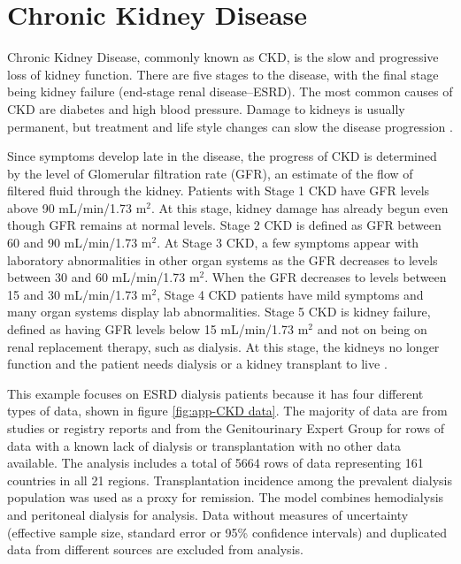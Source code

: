 \chapter{Chronic Kidney Disease}
\label{applications-fits_incon_v_con}

Chronic Kidney Disease, commonly known as CKD, is the slow and progressive loss of kidney function. There are five stages to the disease, with the final stage being kidney failure (end-stage renal disease--ESRD). The most common causes of CKD are diabetes and high blood pressure.  Damage to kidneys is usually permanent, but treatment and life style changes can slow the disease progression \cite{national_KDOQI_2002}.

Since symptoms develop late in the disease, the progress of CKD is determined by the level of Glomerular filtration rate (GFR), an estimate of the flow of filtered fluid through the kidney. Patients with Stage 1 CKD have GFR levels above 90 mL/min/1.73 m$^2$.  At this stage, kidney damage has already begun even though GFR remains at normal levels.   Stage 2 CKD is defined as GFR between 60 and 90 mL/min/1.73 m$^2$.  At Stage 3 CKD, a few symptoms appear with laboratory abnormalities in other organ systems as the GFR decreases to levels between 30 and 60 mL/min/1.73 m$^2$.  When the GFR decreases to levels between 15 and 30 mL/min/1.73 m$^2$, Stage 4 CKD patients have mild symptoms and many organ systems display lab abnormalities.  Stage 5 CKD is kidney failure, defined as having GFR levels below 15 mL/min/1.73 m$^2$ and not on being on renal replacement therapy, such as dialysis.  At this stage, the kidneys no longer function and the patient needs dialysis or a kidney transplant to live \cite{national_KDOQI_2002}.

This example focuses on ESRD dialysis patients because it has four different types of data, shown in figure \ref{fig:app-CKD data}.  The majority of data are from studies or registry reports and from the Genitourinary Expert Group for rows of data with a known lack of dialysis or transplantation with no other data available.  The analysis includes a total of 5664 rows of data representing 161 countries in all 21 regions. Transplantation incidence among the prevalent dialysis population was used as a proxy for remission.  The model combines hemodialysis and peritoneal dialysis for analysis.  Data without measures of uncertainty (effective sample size, standard error or 95\% confidence intervals) and duplicated data from different sources are excluded from analysis.

